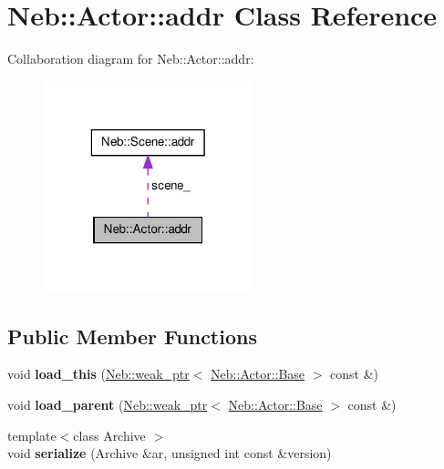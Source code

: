 \hypertarget{classNeb_1_1Actor_1_1addr}{\section{\-Neb\-:\-:\-Actor\-:\-:addr \-Class \-Reference}
\label{classNeb_1_1Actor_1_1addr}
}


\-Collaboration diagram for \-Neb\-:\-:\-Actor\-:\-:addr\-:\nopagebreak
\begin{figure}[H]
\begin{center}
\leavevmode
\includegraphics[width=172pt]{classNeb_1_1Actor_1_1addr__coll__graph}
\end{center}
\end{figure}
\subsection*{\-Public \-Member \-Functions}
\begin{DoxyCompactItemize}
\item 
\hypertarget{classNeb_1_1Actor_1_1addr_a1766152c8fc2867128dcb930a469854f}{void {\bfseries load\-\_\-this} (\hyperlink{classNeb_1_1weak__ptr}{\-Neb\-::weak\-\_\-ptr}$<$ \hyperlink{classNeb_1_1Actor_1_1Base}{\-Neb\-::\-Actor\-::\-Base} $>$ const \&)}\label{classNeb_1_1Actor_1_1addr_a1766152c8fc2867128dcb930a469854f}

\item 
\hypertarget{classNeb_1_1Actor_1_1addr_adea65baf902a852a54dac67130787d36}{void {\bfseries load\-\_\-parent} (\hyperlink{classNeb_1_1weak__ptr}{\-Neb\-::weak\-\_\-ptr}$<$ \hyperlink{classNeb_1_1Actor_1_1Base}{\-Neb\-::\-Actor\-::\-Base} $>$ const \&)}\label{classNeb_1_1Actor_1_1addr_adea65baf902a852a54dac67130787d36}

\item 
\hypertarget{classNeb_1_1Actor_1_1addr_aa98d825c934853c3e0cf7ed56c7f83d5}{{\footnotesize template$<$class Archive $>$ }\\void {\bfseries serialize} (\-Archive \&ar, unsigned int const \&version)}\label{classNeb_1_1Actor_1_1addr_aa98d825c934853c3e0cf7ed56c7f83d5}

\end{DoxyCompactItemize}
